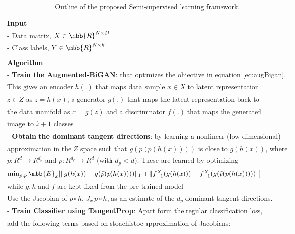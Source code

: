 \documentclass{article}
\begin{document}
{\begin{table}[h]
	\centering
	\caption{Outline of the proposed Semi-supervised learning framework.}
	\begin{tabular}{|l|}
		\hline
		\textbf{Input} \\
		- Data matrix, $X \in \mbb{R}^{N \times D}$  \\
		- Class labels, $Y \in \mbb{R}^{N \times k}$ \\ \\
		\textbf{Algorithm}\\
		\quad - \textbf{Train the Augmented-BiGAN}: that optimizes the objective in equation \ref{eq:augBigan}. \\ \quad \quad  This gives an encoder $h(.)$ that maps data sample $x \in X$ to latent representation \\ \quad \quad $z \in Z$ as $z = h(x)$, a generator $g(.)$ that maps the latent representation back to \\ \quad \quad the data manifold as $x = g(z)$ and a discriminator $f(.)$ that maps the generated \\ \quad \quad image to $k+1$ classes.\\
		\quad - \textbf{Obtain the dominant tangent directions}: by learning a nonlinear (low-dimensional) \\ \quad \quad approximation in the $Z$ space such that $g(\bar{p}(p(h(x))))$ is close to $g(h(x))$, where \\ \quad \quad $p:R^d\to R^{d_p}$ and $\bar{p}:R^{d_p}\to R^d$ (with $d_p < d$). These are learned by optimizing \\ \quad \quad  $\min_{p,\bar{p}} \mbb{E}_x [\lVert g(h(x))-g(\bar{p}(p(h(x))))\rVert_1 + \lVert f^{X}_{-1}(g(h(x))) - f^X_{-1}(g(\bar{p}(p(h(x)))))\rVert]$ \\ \quad \quad while $g,h$ and $f$ are kept fixed from the pre-trained model. \\ 
		\quad \quad Use the Jacobian of $p\circ h$, $J_x\, p\circ h$, as an estimate of the $d_p$ dominant tangent directions. \\
		\quad - \textbf{Train Classifier using TangentProp}: Apart form the regular classification loss, \\ \quad \quad add the following terms based on stoachistoc approximation of Jacobians: \\

\end{tabular}
\end{table}}
\end{document}
